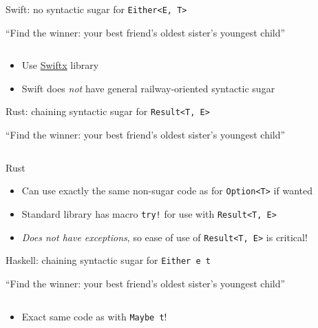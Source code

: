 \begin{frame}{Swift: no syntactic sugar for \texttt{Either<E, T>}}
  \begin{example}{``Find the winner: your best friend's oldest sister's
      youngest child''}
    \inputminted{swift}{ResultWinner.swift}
  \end{example}

  \begin{itemize}
  \item Use
    \href{https://github.com/typelift/Swiftx}{Swiftx} library
    \item Swift does \emph{not} have general railway-oriented syntactic sugar
  \end{itemize}
\end{frame}

\begin{frame}{Rust: chaining syntactic sugar for \texttt{Result<T, E>}}
  \begin{example}{``Find the winner: your best friend's oldest sister's
      youngest child''}
    \inputminted{rust}{result_winner.rs}
  \end{example}

  Rust
  \begin{itemize}
  \item Can use exactly the same non-sugar code as for
    \texttt{Option<T>} if wanted
  \item Standard library has macro \texttt{try!} for use with \texttt{Result<T, E>}
  \item \emph{Does not have exceptions}, so ease of use of
    \texttt{Result<T, E>} is critical!
  \end{itemize}
\end{frame}

\begin{frame}{Haskell: chaining syntactic sugar for \texttt{Either e t}}
  \begin{example}{``Find the winner: your best friend's oldest sister's
      youngest child''}
    \inputminted{haskell}{ResultWinner.hs}
  \end{example}

  \begin{itemize}
  \item Exact same code as with \texttt{Maybe t}!
  \end{itemize}
\end{frame}


